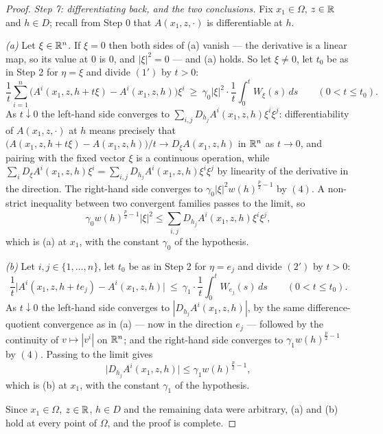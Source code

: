 \begin{proof}
\emph{Step 7: differentiating back, and the two conclusions.}  Fix $x_1\in\Omega$,
$z\in\mathbb{R}$ and $h\in D$; recall from Step 0 that $A(x_1,z,\cdot)$ is
differentiable at $h$.

\emph{(a)}  Let $\xi\in\mathbb{R}^n$.  If $\xi=0$ then both sides of (a) vanish --- the
derivative is a linear map, so its value at $0$ is $0$, and $|\xi|^2=0$ --- and
(a) holds.  So let $\xi\ne0$, let $t_0$ be as in Step 2 for $\eta=\xi$ and
divide $(1')$ by $t>0$:
\[
\frac1t\sum_{i=1}^n\bigl(A^i(x_1,z,h+t\xi)-A^i(x_1,z,h)\bigr)\xi^i
\ \ge\ \gamma_0|\xi|^2\cdot\frac1t\int_0^tW_\xi(s)\,ds
\qquad(0<t\le t_0).
\]
As $t\downarrow0$ the left-hand side converges to
$\sum_{i,j}D_{h_j}A^i(x_1,z,h)\xi^i\xi^j$: differentiability of
$A(x_1,z,\cdot)$ at $h$ means precisely that
$\bigl(A(x_1,z,h+t\xi)-A(x_1,z,h)\bigr)/t\to D_\xi A(x_1,z,h)$ in $\mathbb{R}^n$ as
$t\to0$, and pairing with the fixed vector $\xi$ is a continuous operation,
while $\sum_iD_\xi A^i(x_1,z,h)\xi^i=\sum_{i,j}D_{h_j}A^i(x_1,z,h)\xi^i\xi^j$
by linearity of the derivative in the direction.  The right-hand side converges
to $\gamma_0|\xi|^2w(h)^{\frac p2-1}$ by $(4)$.  A non-strict inequality between
two convergent families passes to the limit, so
\[
\gamma_0w(h)^{\frac p2-1}|\xi|^2\le\sum_{i,j}D_{h_j}A^i(x_1,z,h)\xi^i\xi^j ,
\]
which is (a) at $x_1$, with the constant $\gamma_0$ of the hypothesis.

\emph{(b)}  Let $i,j\in\{1,\dots,n\}$, let $t_0$ be as in Step 2 for
$\eta=e_j$ and divide $(2')$ by $t>0$:
\[
\frac1t\bigl|A^i(x_1,z,h+te_j)-A^i(x_1,z,h)\bigr|
\ \le\ \gamma_1\cdot\frac1t\int_0^tW_{e_j}(s)\,ds
\qquad(0<t\le t_0).
\]
As $t\downarrow0$ the left-hand side converges to
$|D_{h_j}A^i(x_1,z,h)|$, by the same difference-quotient convergence as in (a)
--- now in the direction $e_j$ --- followed by the continuity of
$v\mapsto|v^i|$ on $\mathbb{R}^n$; and the right-hand side converges to
$\gamma_1w(h)^{\frac p2-1}$ by $(4)$.  Passing to the limit gives
\[
\bigl|D_{h_j}A^i(x_1,z,h)\bigr|\le\gamma_1w(h)^{\frac p2-1},
\]
which is (b) at $x_1$, with the constant $\gamma_1$ of the hypothesis.

Since $x_1\in\Omega$, $z\in\mathbb{R}$, $h\in D$ and the remaining data were arbitrary,
(a) and (b) hold at every point of $\Omega$, and the proof is complete.
\end{proof}
